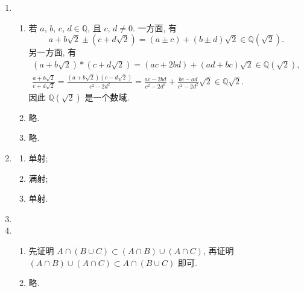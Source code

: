 \documentclass[a4paper, 11pt]{ctexart}
\begin{document}
    \begin{enumerate}
        \item %
            \begin{enumerate}[(1)]
                \item %
                    若 $a$, $b$, $c$, $d \in \mathbb{Q}$, 且 $c$, $d \neq 0$.  一方面, 有
                    \[
                        a + b\sqrt{2} \pm (c + d\sqrt{2}) = (a \pm c) + (b \pm d)\sqrt{2} \in  \mathbb{Q}(\sqrt{2}).    
                    \]
                    另一方面, 有
                    \begin{gather*}
                        (a + b\sqrt{2}) * (c + d\sqrt{2}) = (ac + 2bd) + (ad + bc)\sqrt{2} \in \mathbb{Q}(\sqrt{2}), \\
                        \frac{a + b\sqrt{2}}{c + d\sqrt{2}} = \frac{(a + b\sqrt{2})(c - d\sqrt{2})}{c^2 - 2d^2} = \frac{ac - 2bd}{c^2 - 2d^2} + \frac{bc - ad}{c^2 - 2d^2}\sqrt{2} \in \mathbb{Q}\sqrt{2}.    
                    \end{gather*}
                    因此 $\mathbb{Q}(\sqrt{2})$ 是一个数域. 
                \item %
                    略.
                \item %
                    略.
            \end{enumerate}
        \item %
            \begin{multicols}{3}
                \begin{enumerate}[(1)]
                    \item %
                        单射;
                    \item %
                        满射;
                    \item %
                        单射.
                \end{enumerate}
            \end{multicols}
        \item %
        \item %
            \begin{enumerate}[(1)]
                \item %
                    先证明 $A \cap (B \cup C) \subset (A \cap B) \cup (A \cap C)$, 再证明 $(A \cap B) \cup (A \cap C) \subset A \cap (B \cup C)$ 即可.
                \item %
                    略.
            \end{enumerate}

\end{enumerate}
\end{document}
